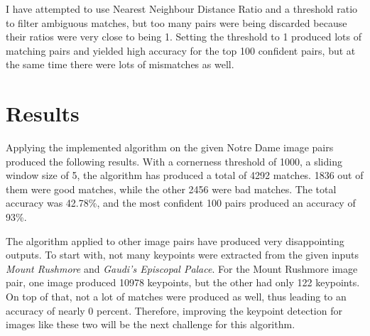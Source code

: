 I have attempted to use Nearest Neighbour Distance Ratio and a threshold ratio to filter ambiguous matches, but too many pairs were being discarded because their ratios were very close to being 1. Setting the threshold to 1 produced lots of matching pairs and yielded high accuracy for the top 100 confident pairs, but at the same time there were lots of mismatches as well.

\section*{Results}
Applying the implemented algorithm on the given Notre Dame image pairs produced the following results. With a cornerness threshold of 1000, a sliding window size of 5, the algorithm has produced a total of 4292 matches. 1836 out of them were good matches, while the other 2456 were bad matches. The total accuracy was 42.78\%, and the most confident 100 pairs produced an accuracy of 93\%.

The algorithm applied to other image pairs have produced very disappointing outputs. To start with, not many keypoints were extracted from the given inputs \emph{Mount Rushmore} and \emph{Gaudi's Episcopal Palace}. For the Mount Rushmore image pair, one image produced 10978 keypoints, but the other had only 122 keypoints. On top of that, not a lot of matches were produced as well, thus leading to an accuracy of nearly 0 percent. Therefore, improving the keypoint detection for images like these two will be the next challenge for this algorithm.


